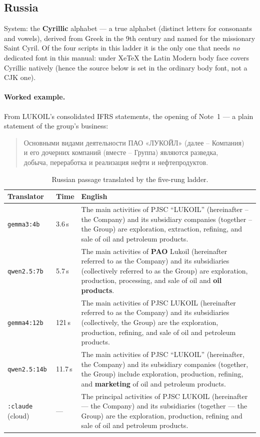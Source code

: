 \documentclass[11pt,a4paper]{report}
\begin{document}
\subsection{Russia}
System: the \textbf{Cyrillic} alphabet --- a true alphabet (distinct letters for consonants and vowels),
derived from Greek in the 9th century and named for the missionary Saint Cyril. Of the four scripts in this
ladder it is the only one that needs \emph{no} dedicated font in this manual: under XeTeX the Latin Modern
body face covers Cyrillic natively (hence the source below is set in the ordinary body font, not a CJK one).

\paragraph{Worked example.} From LUKOIL's consolidated IFRS statements, the opening of Note~1 --- a plain
statement of the group's business:
\begin{quote}
{\rusfont Основными видами деятельности ПАО «ЛУКОЙЛ» (далее -- Компания)\\
и его дочерних компаний (вместе -- Группа) являются разведка,\\
добыча, переработка и реализация нефти и нефтепродуктов.}
\end{quote}

\begin{table}[h]
\small
\caption{Russian passage translated by the five-rung ladder.}
\label{tab:ladder-russia}
\begin{tabular}{@{}l l p{}@{}}
\toprule
\textbf{Translator} & \textbf{Time} & \textbf{English} \\
\midrule
\texttt{gemma3:4b} & 3.6\,s & The main activities of PJSC ``LUKOIL'' (hereinafter -- the Company) and its subsidiary companies (together -- the Group) are exploration, extraction, refining, and sale of oil and petroleum products. \\
\addlinespace
\texttt{qwen2.5:7b} & 5.7\,s & The main activities of \textbf{PAO} Lukoil (hereinafter referred to as the Company) and its subsidiaries (collectively referred to as the Group) are exploration, production, processing, and sale of oil and \textbf{oil products}. \\
\addlinespace
\texttt{gemma4:12b} & 121\,s & The main activities of PJSC LUKOIL (hereinafter referred to as the Company) and its subsidiaries (collectively, the Group) are the exploration, production, refining, and sale of oil and petroleum products. \\
\addlinespace
\texttt{qwen2.5:14b} & 11.7\,s & The main activities of PJSC ``LUKOIL'' (hereinafter, the Company) and its subsidiary companies (together, the Group) include exploration, production, refining, and \textbf{marketing} of oil and petroleum products. \\
\addlinespace
\texttt{:claude} (cloud) & --- & The principal activities of PJSC LUKOIL (hereinafter --- the Company) and its subsidiaries (together --- the Group) are the exploration, production, refining and sale of oil and petroleum products. \\
\bottomrule
\end{tabular}
\end{table}
\end{document}
